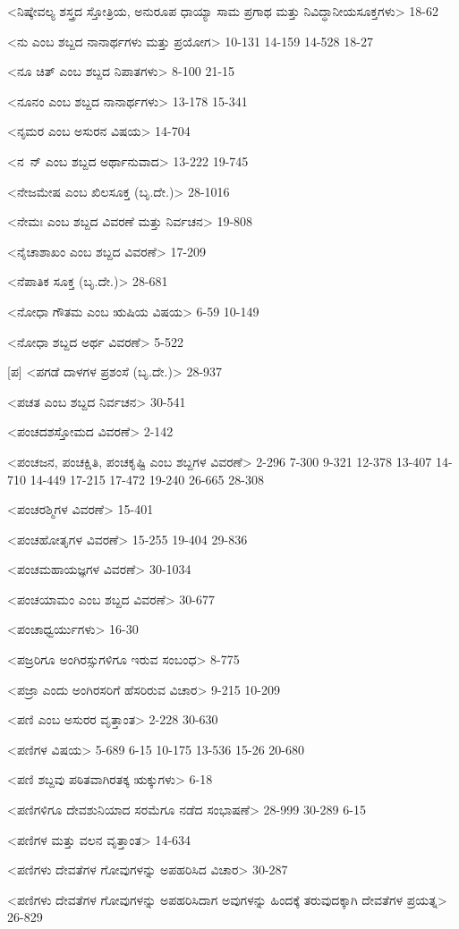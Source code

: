 <ನಿಷ್ಕೇವಲ್ಯ ಶಸ್ತ್ರದ ಸ್ತೋತ್ರಿಯ, ಅನುರೂಪ ಧಾಯ್ಯಾ ಸಾಮ ಪ್ರಗಾಥ ಮತ್ತು ನಿವಿದ್ಧಾನೀಯಸೂಕ್ತಗಳು>
18-62

<ನು ಎಂಬ ಶಬ್ದದ ನಾನಾರ್ಥಗಳು ಮತ್ತು ಪ್ರಯೋಗ>
10-131 
14-159 
14-528 
18-27

<ನೂ ಚಿತ್‍ ಎಂಬ ಶಬ್ದದ ನಿಪಾತಗಳು>
8-100 
21-15

<ನೂನಂ ಎಂಬ ಶಬ್ದದ ನಾನಾರ್ಥಗಳು>
13-178 
15-341

<ನೃಮರ ಎಂಬ ಅಸುರನ ವಿಷಯ>
14-704

<ನ\ ನ್‍ ಎಂಬ ಶಬ್ದದ ಅರ್ಥಾನುವಾದ>
13-222 
19-745

<ನೇಜಮೇಷ ಎಂಬ ಖಿಲಸೂಕ್ತ (ಬೃ.ದೇ.)>
28-1016

<ನೇಮಃ ಎಂಬ ಶಬ್ದದ ವಿವರಣೆ ಮತ್ತು ನಿರ್ವಚನ>
19-808

<ನೈಚಾಶಾಖಂ ಎಂಬ ಶಬ್ದದ ವಿವರಣೆ>
17-209

<ನೆಪಾತಿಕ ಸೂಕ್ತ (ಬೃ.ದೇ.)>
28-681

<ನೋಧಾ ಗೌತಮ ಎಂಬ ಋಷಿಯ ವಿಷಯ>
6-59 
10-149

<ನೋಧಾ ಶಬ್ದದ ಅರ್ಥ ವಿವರಣೆ>
5-522

[ಪ]
<ಪಗಡೆ ದಾಳಗಳ ಪ್ರಶಂಸೆ (ಬೃ.ದೇ.)>
28-937

<ಪಚತ ಎಂಬ ಶಬ್ದದ ನಿರ್ವಚನ>
30-541

<ಪಂಚದಶಸ್ತೋಮದ ವಿವರಣೆ>
2-142

<ಪಂಚಜನ, ಪಂಚಕ್ಷಿತಿ, ಪಂಚಕೃಷ್ಟಿ ಎಂಬ ಶಬ್ದಗಳ ವಿವರಣೆ>
2-296 
7-300 
9-321
12-378 
13-407 
14-710 
14-449 
17-215 
17-472
19-240 
26-665
28-308

<ಪಂಚರಶ್ಮಿಗಳ ವಿವರಣೆ>
15-401

<ಪಂಚಹೋತೃಗಳ ವಿವರಣೆ>
15-255 
19-404
29-836

<ಪಂಚಮಹಾಯಜ್ಞಗಳ ವಿವರಣೆ>
30-1034

<ಪಂಚಯಾಮಂ ಎಂಬ ಶಬ್ದದ ವಿವರಣೆ>
30-677

<ಪಂಚಾಧ್ವರ್ಯುಗಳು>
16-30

<ಪಜ್ರರಿಗೂ ಅಂಗಿರಸ್ಸುಗಳಿಗೂ ಇರುವ ಸಂಬಂಧ>
8-775

<ಪಜ್ರಾ ಎಂದು ಅಂಗಿರಸರಿಗೆ ಹೆಸರಿರುವ ವಿಚಾರ>
9-215
10-209

<ಪಣಿ ಎಂಬ ಅಸುರರ ವೃತ್ತಾಂತ>
2-228
30-630

<ಪಣಿಗಳ ವಿಷಯ>
5-689 
6-15 
10-175 
13-536
15-26
20-680

<ಪಣಿ ಶಬ್ದವು ಪಠಿತವಾಗಿರತಕ್ಕ ಋಕ್ಕುಗಳು>
6-18

<ಪಣಿಗಳಿಗೂ ದೇವಶುನಿಯಾದ ಸರಮೆಗೂ ನಡೆದ ಸಂಭಾಷಣೆ>
28-999 
30-289
6-15

<ಪಣಿಗಳ ಮತ್ತು ವಲನ ವೃತ್ತಾಂತ>
14-634

<ಪಣಿಗಳು ದೇವತೆಗಳ ಗೋವುಗಳನ್ನು ಅಪಹರಿಸಿದ ವಿಚಾರ>
30-287

<ಪಣಿಗಳು ದೇವತೆಗಳ ಗೋವುಗಳನ್ನು ಅಪಹರಿಸಿದಾಗ ಅವುಗಳನ್ನು ಹಿಂದಕ್ಕೆ ತರುವುದಕ್ಕಾಗಿ ದೇವತೆಗಳ ಪ್ರಯತ್ನ>
26-829

